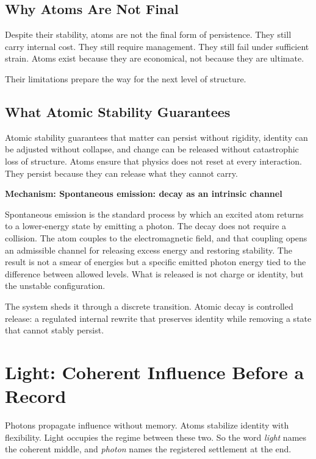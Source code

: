 \documentclass[11pt,twoside,openright]{book}
\newenvironment{mechanismbox}[1]
  {\begin{framed}\noindent\textbf{Mechanism: #1}\par\medskip}
  {\end{framed}}
\begin{document}
\section*{Why Atoms Are Not Final}

Despite their stability, atoms are not the final form of persistence. They still carry internal cost. They still require management. They still fail under sufficient strain. Atoms exist because they are economical, not because they are ultimate.

Their limitations prepare the way for the next level of structure.

\section*{What Atomic Stability Guarantees}

Atomic stability guarantees that matter can persist without rigidity, identity can be adjusted without collapse, and change can be released without catastrophic loss of structure. Atoms ensure that physics does not reset at every interaction. They persist because they can release what they cannot carry.

\begin{mechanismbox}{Spontaneous emission: decay as an intrinsic channel}

Spontaneous emission is the standard process by which an excited atom returns to a lower-energy state by emitting a photon. The decay does not require a collision. The atom couples to the electromagnetic field, and that coupling opens an admissible channel for releasing excess energy and restoring stability. The result is not a smear of energies but a specific emitted photon energy tied to the difference between allowed levels. What is released is not charge or identity, but the unstable configuration.

The system sheds it through a discrete transition. Atomic decay is controlled release: a regulated internal rewrite that preserves identity while removing a state that cannot stably persist.

\end{mechanismbox}
\chapter{Light: Coherent Influence Before a Record}

Photons propagate influence without memory. Atoms stabilize identity with flexibility. Light occupies the regime between these two. So the word \emph{light} names the coherent middle, and \emph{photon} names the registered settlement at the end.
\end{document}
